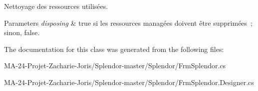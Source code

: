 Nettoyage des ressources utilisées. 


\begin{DoxyParams}{Parameters}
{\em disposing} & true si les ressources managées doivent être supprimées ; sinon, false.\\
\hline
\end{DoxyParams}


The documentation for this class was generated from the following files\+:\begin{DoxyCompactItemize}
\item 
M\+A-\/24-\/\+Projet-\/\+Zacharie-\/\+Joris/\+Splendor-\/master/\+Splendor/Frm\+Splendor.\+cs\item 
M\+A-\/24-\/\+Projet-\/\+Zacharie-\/\+Joris/\+Splendor-\/master/\+Splendor/Frm\+Splendor.\+Designer.\+cs\end{DoxyCompactItemize}
